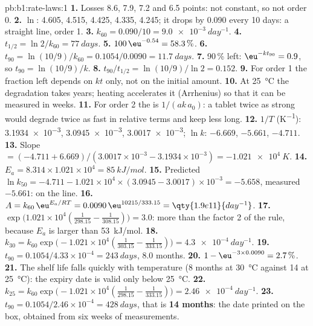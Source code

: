 \begin{solution}{pb:b1:rate-laws:1}
\textbf{1.} Losses 8.6, 7.9, 7.2 and 6.5 points: not constant, so not
order 0.
\textbf{2.} $\ln$: 4.605, 4.515, 4.425, 4.335, 4.245; it drops by 0.090
every 10 days: a straight line, order 1.
\textbf{3.} $k_{60} = 0.090/10 = \qty{9.0e-3}{day^{-1}}$.
\textbf{4.} $t_{1/2} = \ln2/k_{60} = \qty{77}{days}$.
\textbf{5.} $100\,\eu^{-0.54} = 58.3\,\%$.
\textbf{6.} $t_{90} = \ln(10/9)/k_{60} = 0.1054/0.0090 = \qty{11.7}{days}$.
\textbf{7.} 90\,\% left: $\eu^{-kt_{90}} = 0.9$, so $t_{90} = \ln(10/9)/k$.
\textbf{8.} $t_{90}/t_{1/2} = \ln(10/9)/\ln2 = 0.152$.
\textbf{9.} For order 1 the fraction left depends on $kt$ only, not on the
initial amount.
\textbf{10.} At \qty{25}{\celsius} the degradation takes years; heating
accelerates it (Arrhenius) so that it can be measured in weeks.
\textbf{11.} For order 2 the  is $1/(ak\,a_0)$: a tablet twice as
strong would degrade twice as fast in relative terms and keep less long.
\textbf{12.} $1/T$ (\unit{K^{-1}}): \num{3.1934e-3}, \num{3.0945e-3},
\num{3.0017e-3}; $\ln k$: $-6.669$, $-5.661$, $-4.711$.
\textbf{13.} Slope $= (-4.711 + 6.669)/(3.0017 \times 10^{-3} - 3.1934 \times
10^{-3}) = \qty{-1.021e4}{K}$.
\textbf{14.} $E_a = 8.314 \times 1.021 \times 10^4 = \qty{85}{kJ/mol}$.
\textbf{15.} Predicted $\ln k_{50} = -4.711 - 1.021 \times 10^4 \times (3.0945 -
3.0017) \times 10^{-3} = -5.658$, measured $-5.661$: on the line.
\textbf{16.} $A = k_{60}\,\eu^{E_a/RT} = 0.0090\,\eu^{10215/333.15} =
\qty{1.9e11}{day^{-1}}$.
\textbf{17.} $\exp\big(1.021 \times 10^4(\frac{1}{298.15} -
\frac{1}{308.15})\big) = 3.0$: more than the factor 2 of the rule, because
$E_a$ is larger than \qty{53}{kJ/mol}.
\textbf{18.} $k_{30} = k_{60}\exp\big(-1.021 \times 10^4(\frac{1}{303.15} -
\frac{1}{333.15})\big) = \qty{4.3e-4}{day^{-1}}$.
\textbf{19.} $t_{90} = 0.1054/4.33 \times 10^{-4} = \qty{243}{days}$, 8.0
months.
\textbf{20.} $1 - \eu^{-3 \times 0.0090} = 2.7\,\%$.
\textbf{21.} The shelf life falls quickly with temperature (8 months at
\qty{30}{\celsius} against 14 at \qty{25}{\celsius}): the expiry date is
valid only below \qty{25}{\celsius}.
\textbf{22.} $k_{25} = k_{60}\exp\big(-1.021 \times 10^4(\frac{1}{298.15} -
\frac{1}{333.15})\big) = \qty{2.46e-4}{day^{-1}}$.
\textbf{23.} $t_{90} = 0.1054/2.46 \times 10^{-4} = \qty{428}{days}$, that
is \textbf{14 months}: the date printed on the box, obtained from six
weeks of measurements.
\end{solution}
